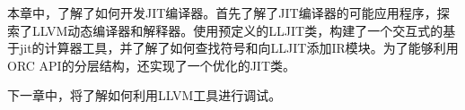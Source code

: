 本章中，了解了如何开发JIT编译器。首先了解了JIT编译器的可能应用程序，探索了LLVM动态编译器和解释器。使用预定义的LLJIT类，构建了一个交互式的基于jit的计算器工具，并了解了如何查找符号和向LLJIT添加IR模块。为了能够利用ORC API的分层结构，还实现了一个优化的JIT类。

下一章中，将了解如何利用LLVM工具进行调试。
